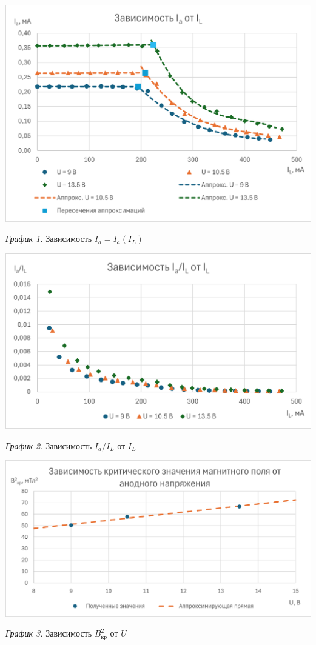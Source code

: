 \hypertarget{diagram1}{}

\begin{center}
    \includegraphics[width=15cm]{images/graphic1}

    \smallvspace

    \textit{График 1.} Зависимость $I_a = I_a(I_L)$
\end{center}

\hypertarget{diagram2}{}

\begin{center}
    \includegraphics[width=15cm]{images/graphic2}

    \smallvspace

    \textit{График 2.} Зависимость $I_a/I_L$ от $I_L$
\end{center}

\hypertarget{diagram3}{}

\begin{center}
    \includegraphics[width=15cm]{images/graphic3}

    \smallvspace

    \textit{График 3.} Зависимость $B^2_\text{кр}$ от $U$
\end{center}
